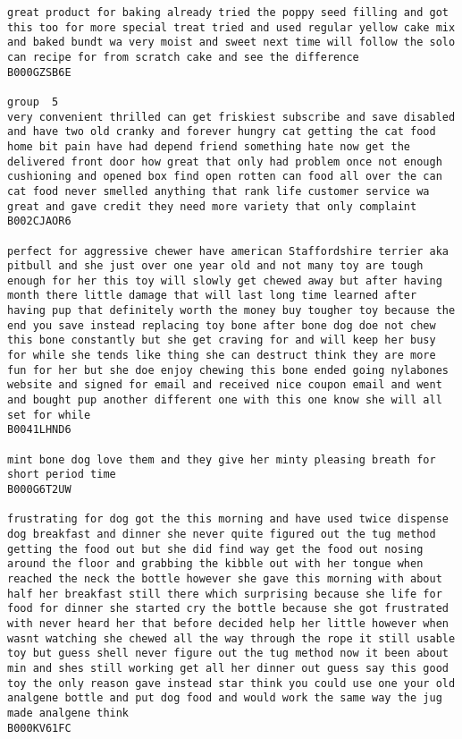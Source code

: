 \documentclass[11pt]{article}
\begin{document}
\begin{Verbatim}[commandchars=\\\{\}]
great product for baking already tried the poppy seed filling and got this too for more special treat tried and used regular yellow cake mix and baked bundt wa very moist and sweet next time will follow the solo can recipe for from scratch cake and see the difference
B000GZSB6E

group  5
very convenient thrilled can get friskiest subscribe and save disabled and have two old cranky and forever hungry cat getting the cat food home bit pain have had depend friend something hate now get the delivered front door how great that only had problem once not enough cushioning and opened box find open rotten can food all over the can cat food never smelled anything that rank life customer service wa great and gave credit they need more variety that only complaint
B002CJAOR6

perfect for aggressive chewer have american Staffordshire terrier aka pitbull and she just over one year old and not many toy are tough enough for her this toy will slowly get chewed away but after having month there little damage that will last long time learned after having pup that definitely worth the money buy tougher toy because the end you save instead replacing toy bone after bone dog doe not chew this bone constantly but she get craving for and will keep her busy for while she tends like thing she can destruct think they are more fun for her but she doe enjoy chewing this bone ended going nylabones website and signed for email and received nice coupon email and went and bought pup another different one with this one know she will all set for while
B0041LHND6

mint bone dog love them and they give her minty pleasing breath for short period time
B000G6T2UW

frustrating for dog got the this morning and have used twice dispense dog breakfast and dinner she never quite figured out the tug method getting the food out but she did find way get the food out nosing around the floor and grabbing the kibble out with her tongue when reached the neck the bottle however she gave this morning with about half her breakfast still there which surprising because she life for food for dinner she started cry the bottle because she got frustrated with never heard her that before decided help her little however when wasnt watching she chewed all the way through the rope it still usable toy but guess shell never figure out the tug method now it been about min and shes still working get all her dinner out guess say this good toy the only reason gave instead star think you could use one your old analgene bottle and put dog food and would work the same way the jug made analgene think
B000KV61FC


\end{Verbatim}
\end{document}
